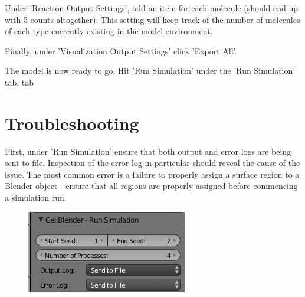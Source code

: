 \documentclass[twoside,a4paper]{refart}
\begin{document}
Under 'Reaction Output Settings', add an item for each molecule (should end up with 5 counts altogether). This setting will keep track of the number of molecules of each type currently existing in the model environment.

Finally, under 'Visualization Output Settings' click 'Export All'.

The model is now ready to go. Hit 'Run Simulation' under the 'Run Simulation' tab.
tab
\section{Troubleshooting}
 First, under 'Run Simulation' ensure that both output and error logs are being sent to file. Inspection of the error log in particular should reveal the cause of the issue. The most common error is a failure to properly assign a surface region to a Blender object - ensure that all regions are properly assigned before commencing a simulation run.

    \begin{figure}[H]
        \includegraphics[scale=0.5]{trouble1.png}
    \end{figure}
\end{document}
